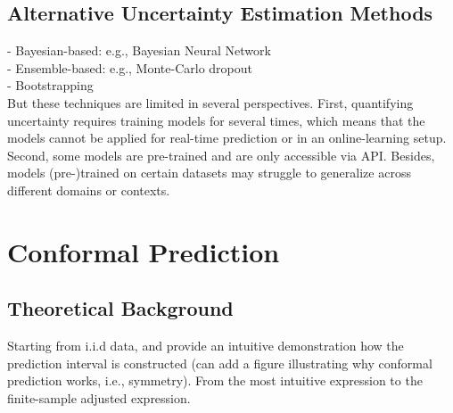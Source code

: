 \documentclass[a4paper,oneside,bibliography=totoc]{scrbook}
\begin{document}
\subsection{Alternative Uncertainty Estimation Methods}
- Bayesian-based: e.g., Bayesian Neural Network \\
- Ensemble-based: e.g., Monte-Carlo dropout \\
- Bootstrapping \\
But these techniques are limited in several perspectives. First, quantifying uncertainty requires training models for several times, which means that the models cannot be applied for real-time prediction or in an online-learning setup. Second, some models are pre-trained and are only accessible via API. Besides, models (pre-)trained on certain datasets may struggle to generalize across different domains or contexts. 

\section{Conformal Prediction}

\subsection{Theoretical Background}
Starting from i.i.d data, and provide an intuitive demonstration how the prediction interval is constructed (can add a figure illustrating why conformal prediction works, i.e., symmetry). From the most intuitive expression to the finite-sample adjusted expression. 
		
\end{document}
